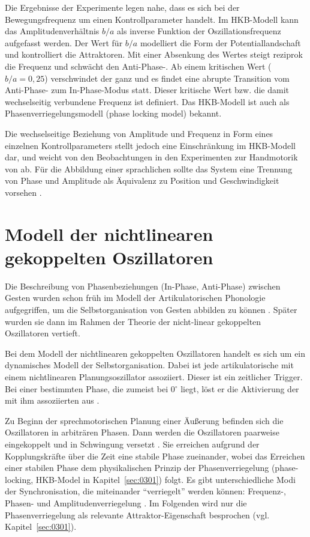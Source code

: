 Die Ergebnisse der Experimente legen nahe, dass es sich bei der Bewegungsfrequenz um einen Kontrollparameter handelt. Im HKB-Modell kann das Amplitudenverhältnis $b/{a}$ als inverse Funktion der Oszillationsfrequenz aufgefasst werden. Der Wert für $b/{a}$ modelliert die Form der Potentiallandschaft und kontrolliert die Attraktoren. Mit einer Absenkung des Wertes steigt reziprok die Frequenz und schwächt den Anti-Phase-. Ab einem kritischen Wert ($b/{a}=0,25$) verschwindet der  ganz und es findet eine abrupte Transition vom Anti-Phase- zum In-Phase-Modus statt. Dieser kritische Wert bzw. die damit wechselseitig verbundene Frequenz ist  definiert. Das HKB-Modell ist auch als Phasenverriegelungsmodell (phase locking model) bekannt. 

Die wechselseitige Beziehung von Amplitude und Frequenz in Form eines einzelnen Kontrollparameters stellt jedoch eine Einschränkung im HKB-Modell dar, und weicht von den Beobachtungen in den Experimenten zur Handmotorik von \citet{Blaufuß2001} ab. Für die Abbildung einer sprachlichen  sollte das System eine Trennung von Phase und Amplitude als Äquivalenz zu Position und Geschwindigkeit vorsehen \citep{Saltzman2000}.

\section{Modell der nichtlinearen gekoppelten Oszillatoren} 
\label{sec:0302}

Die Beschreibung von Phasenbeziehungen (In-Phase, Anti-Phase) zwischen Gesten wurden schon früh im Modell der Artikulatorischen Phonologie aufgegriffen, um die Selbstorganisation von Gesten abbilden zu können \citep{Browman1992a}. Später wurden sie dann im Rahmen der Theorie der nicht-linear gekoppelten Oszillatoren vertieft.

Bei dem Modell der nichtlinearen gekoppelten Oszillatoren handelt es sich um ein dynamisches Modell der Selbstorganisation. Dabei ist jede artikulatorische  mit einem nichtlinearen Planungsoszillator assoziiert. Dieser  ist ein zeitlicher Trigger. Bei einer bestimmten Phase, die zumeist bei $0{}^{\circ}$ liegt, löst er die Aktivierung der mit ihm assoziierten  aus \citep{Nam2009b,Browman2000,Goldstein2009,Nam2003}. 

Zu Beginn der sprechmotorischen Planung einer Äußerung befinden sich die Oszillatoren in arbiträren Phasen. Dann werden die Oszillatoren paarweise eingekoppelt und in Schwingung versetzt \citep{Saltzman2000}. Sie erreichen aufgrund der Kopplungskräfte über die Zeit eine stabile Phase zueinander, wobei das Erreichen einer stabilen Phase dem physikalischen Prinzip der Phasenverriegelung (phase-locking, HKB-Model in Kapitel~\ref{sec:0301}) folgt. Es gibt unterschiedliche Modi der Synchronisation, die miteinander \enquote{verriegelt} werden können: Frequenz-, Phasen- und Amplitudenverriegelung \citep{Goldstein2010}. Im Folgenden wird nur die Phasenverriegelung als relevante Attraktor-Eigenschaft besprochen (vgl. Kapitel~\ref{sec:0301}).

